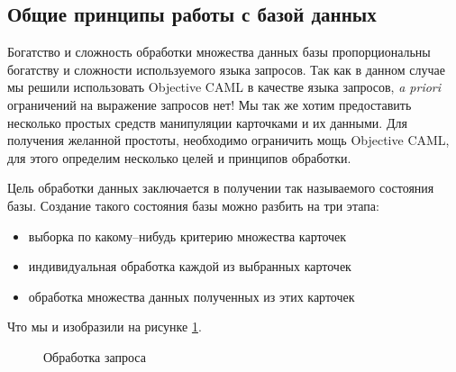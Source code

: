 \subsection{Общие принципы работы с базой данных}
\label{subsec:general_principles_for_database_processing}

Богатство и сложность обработки множества данных базы пропорциональны богатству 
и сложности используемого языка запросов. Так как в данном случае мы решили 
использовать Objective CAML в качестве языка запросов, {\it a priori}
ограничений на выражение запросов нет! Мы так же хотим предоставить несколько 
простых средств манипуляции карточками и их данными. Для получения желанной 
простоты, необходимо ограничить мощь Objective CAML, для этого определим 
несколько целей и принципов обработки.

Цель обработки данных заключается в получении так называемого состояния базы. 
Создание такого состояния базы можно разбить на три этапа:

\begin{itemize}
	\item выборка по какому–нибудь критерию множества карточек

	\item индивидуальная обработка каждой из выбранных карточек

	\item обработка множества данных полученных из этих карточек 
\end{itemize}

Что мы и изобразили на рисунке \ref{fig:processing_a_request}.

\begin{figure}[h]
	\caption{\label{fig:processing_a_request}Обработка запроса}
\end{figure}


